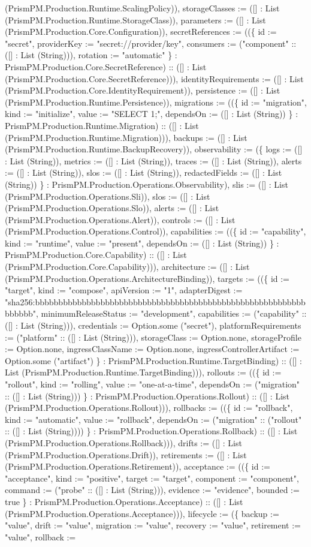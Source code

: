 \documentclass[11pt]{article}
\begin{document}
(PrismPM.Production.Runtime.ScalingPolicy)), storageClasses := ([] : List (PrismPM.Production.Runtime.StorageClass)), parameters := ([] : List (PrismPM.Production.Core.Configuration)), secretReferences := ((\{ id := "secret", providerKey := "secret://provider/key", consumers := ("component" :: ([] : List (String))), rotation := "automatic" \} : PrismPM.Production.Core.SecretReference) :: ([] : List (PrismPM.Production.Core.SecretReference))), identityRequirements := ([] : List (PrismPM.Production.Core.IdentityRequirement)), persistence := ([] : List (PrismPM.Production.Runtime.Persistence)), migrations := ((\{ id := "migration", kind := "initialize", value := "SELECT 1;", dependsOn := ([] : List (String)) \} : PrismPM.Production.Runtime.Migration) :: ([] : List (PrismPM.Production.Runtime.Migration))), backups := ([] : List (PrismPM.Production.Runtime.BackupRecovery)), observability := (\{ logs := ([] : List (String)), metrics := ([] : List (String)), traces := ([] : List (String)), alerts := ([] : List (String)), slos := ([] : List (String)), redactedFields := ([] : List (String)) \} : PrismPM.Production.Operations.Observability), slis := ([] : List (PrismPM.Production.Operations.Sli)), slos := ([] : List (PrismPM.Production.Operations.Slo)), alerts := ([] : List (PrismPM.Production.Operations.Alert)), controls := ([] : List (PrismPM.Production.Operations.Control)), capabilities := ((\{ id := "capability", kind := "runtime", value := "present", dependsOn := ([] : List (String)) \} : PrismPM.Production.Core.Capability) :: ([] : List (PrismPM.Production.Core.Capability))), architecture := ([] : List (PrismPM.Production.Operations.ArchitectureBinding)), targets := ((\{ id := "target", kind := "compose", apiVersion := "1", adapterDigest := "sha256:bbbbbbbbbbbbbbbbbbbbbbbbbbbbbbbbbbbbbbbbbbbbbbbbbbbbbbbbbbbbbbbb", minimumReleaseStatus := "development", capabilities := ("capability" :: ([] : List (String))), credentials := Option.some ("secret"), platformRequirements := ("platform" :: ([] : List (String))), storageClass := Option.none, storageProfile := Option.none, ingressClassName := Option.none, ingressControllerArtifact := Option.some ("artifact") \} : PrismPM.Production.Runtime.TargetBinding) :: ([] : List (PrismPM.Production.Runtime.TargetBinding))), rollouts := ((\{ id := "rollout", kind := "rolling", value := "one-at-a-time", dependsOn := ("migration" :: ([] : List (String))) \} : PrismPM.Production.Operations.Rollout) :: ([] : List (PrismPM.Production.Operations.Rollout))), rollbacks := ((\{ id := "rollback", kind := "automatic", value := "rollback", dependsOn := ("migration" :: ("rollout" :: ([] : List (String)))) \} : PrismPM.Production.Operations.Rollback) :: ([] : List (PrismPM.Production.Operations.Rollback))), drifts := ([] : List (PrismPM.Production.Operations.Drift)), retirements := ([] : List (PrismPM.Production.Operations.Retirement)), acceptance := ((\{ id := "acceptance", kind := "positive", target := "target", component := "component", command := ("probe" :: ([] : List (String))), evidence := "evidence", bounded := true \} : PrismPM.Production.Operations.Acceptance) :: ([] : List (PrismPM.Production.Operations.Acceptance))), lifecycle := (\{ backup := "value", drift := "value", migration := "value", recovery := "value", retirement := "value", rollback := 
\end{document}
